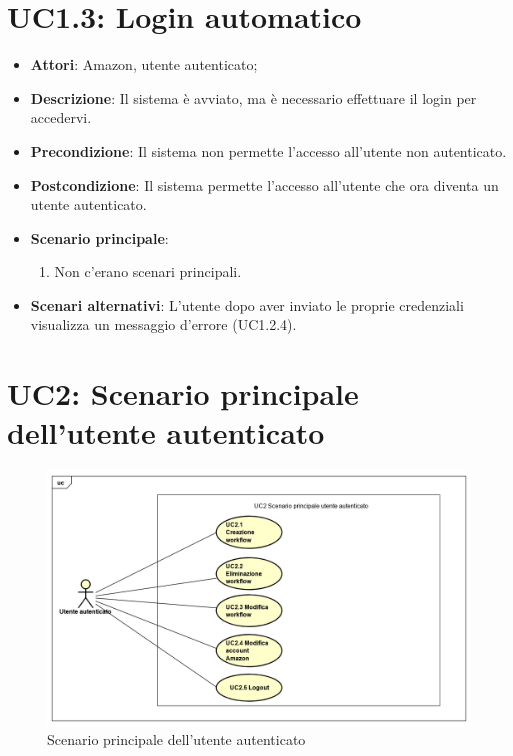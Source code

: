 \section{UC1.3: Login automatico}
\label{UC1.3}
\begin{itemize}
	\item \textbf{Attori}: Amazon, utente autenticato;
	\item \textbf{Descrizione}: Il sistema è avviato, ma è necessario effettuare il login per accedervi.
	\item \textbf{Precondizione}: Il sistema non permette l'accesso all'utente non autenticato.
	\item \textbf{Postcondizione}: Il sistema permette l'accesso all'utente che ora diventa un utente autenticato.
	\item \textbf{Scenario principale}:
	\begin{enumerate} \item Non c'erano scenari principali.\end{enumerate}
	\item \textbf{Scenari alternativi}:
	L'utente dopo aver inviato le proprie credenziali visualizza un messaggio d'errore (UC1.2.4).
\end{itemize}

\section{UC2: Scenario principale dell'utente autenticato}
\label{UC2}
\begin{figure} [h]
	\centering
	\includegraphics[scale=0.4]{./Diagram/UC2.png}
	\caption{Scenario principale dell'utente autenticato }\label{}
\end{figure}

